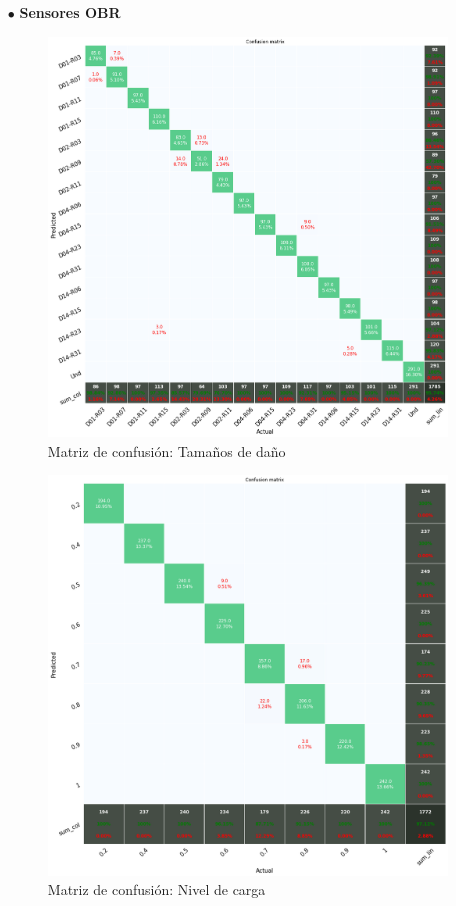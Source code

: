 \begin{itemize}
    
	\item[$\bullet$] \textbf{Sensores OBR}    
    
    \begin{figure}[H]
        \centering
        \includegraphics[width=125mm]{3/Fotos/CM_Ty_Si_OBR.png}
        \captionsetup{justification=centering,margin=1.25cm}
        \caption{Matriz de confusión: Tamaños de daño}
        \label{fig:CM_OBR_Ty_Si}
    \end{figure}  
    
    \begin{figure}[H]
        \centering
        \includegraphics[width=125mm]{3/Fotos/CM_Load_OBR.png}
        \captionsetup{justification=centering,margin=1.25cm}
        \caption{Matriz de confusión: Nivel de carga}
        \label{fig:CM_OBR_Load}
    \end{figure}      
    
    
\end{itemize}


